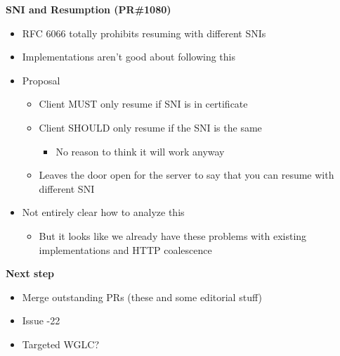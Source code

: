 \documentclass[helvetica]{seminar}
\newcommand{\heading}[1]{%
  \begin{center} 
    \large\bf 
    #1 
  \end{center} 
  \vspace{.4 in}}
\begin{document}
\begin{slide}
  \heading{SNI and Resumption (PR\#1080)}

  \begin{itemize}
  \item RFC 6066 totally prohibits resuming with different SNIs
  \item Implementations aren't good about following this
  \item Proposal
    \begin{itemize}
    \item Client MUST only resume if SNI is in certificate
    \item Client SHOULD only resume if the SNI is the same
      \begin{itemize}
      \item No reason to think it will work anyway
      \end{itemize}
    \item Leaves the door open for the server to say that you can resume with different SNI
    \end{itemize}
  \item Not entirely clear how to analyze this
    \begin{itemize}
    \item But it looks like we already have these problems with existing implementations and HTTP coalescence
    \end{itemize}
  \end{itemize}
\end{slide}


\begin{slide}
\heading{Next step}

\begin{itemize}
\item Merge outstanding PRs (these and some editorial stuff)
\item Issue -22
\item Targeted WGLC?
\end{itemize}
\end{slide}
\end{document}

